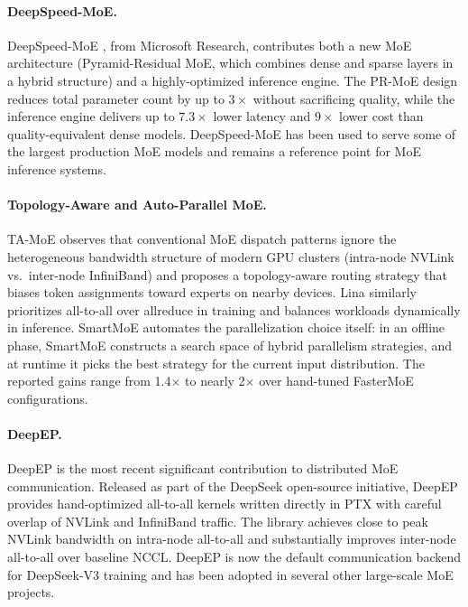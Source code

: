 \documentclass[10pt]{article}
\begin{document}
\paragraph{DeepSpeed-MoE.}
DeepSpeed-MoE \citep{rajbhandari2022deepspeedmoe}, from Microsoft Research, contributes both a new MoE architecture (Pyramid-Residual MoE, which combines dense and sparse layers in a hybrid structure) and a highly-optimized inference engine. The PR-MoE design reduces total parameter count by up to $3\times$ without sacrificing quality, while the inference engine delivers up to $7.3\times$ lower latency and $9\times$ lower cost than quality-equivalent dense models. DeepSpeed-MoE has been used to serve some of the largest production MoE models and remains a reference point for MoE inference systems.

\paragraph{Topology-Aware and Auto-Parallel MoE.}
TA-MoE \citep{chen2022tamoe} observes that conventional MoE dispatch patterns ignore the heterogeneous bandwidth structure of modern GPU clusters (intra-node NVLink vs.\ inter-node InfiniBand) and proposes a topology-aware routing strategy that biases token assignments toward experts on nearby devices. Lina \citep{li2023lina} similarly prioritizes all-to-all over allreduce in training and balances workloads dynamically in inference. SmartMoE \citep{zhai2023smartmoe} automates the parallelization choice itself: in an offline phase, SmartMoE constructs a search space of hybrid parallelism strategies, and at runtime it picks the best strategy for the current input distribution. The reported gains range from 1.4$\times$ to nearly 2$\times$ over hand-tuned FasterMoE configurations.

\paragraph{DeepEP.}
DeepEP \citep{deepep2024} is the most recent significant contribution to distributed MoE communication. Released as part of the DeepSeek open-source initiative, DeepEP provides hand-optimized all-to-all kernels written directly in PTX with careful overlap of NVLink and InfiniBand traffic. The library achieves close to peak NVLink bandwidth on intra-node all-to-all and substantially improves inter-node all-to-all over baseline NCCL. DeepEP is now the default communication backend for DeepSeek-V3 training and has been adopted in several other large-scale MoE projects.
\end{document}
